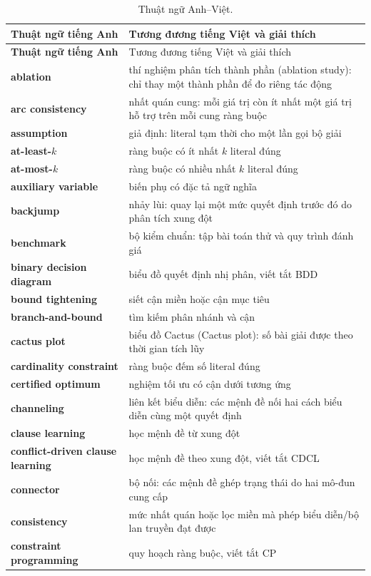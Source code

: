 \documentclass[11pt,a4paper,oneside,openany,headings=normal]{scrbook}
\begin{document}
\begin{longtable}{@{}>{\bfseries\sffamily}p{}p{}@{}}
\caption{Thuật ngữ Anh--Việt.}
\label{tab:glossary}\\
\toprule
Thuật ngữ tiếng Anh & Tương đương tiếng Việt và giải thích\\
\midrule
\endfirsthead
\toprule
Thuật ngữ tiếng Anh & Tương đương tiếng Việt và giải thích\\
\midrule
\endhead
ablation & thí nghiệm phân tích thành phần (ablation study): chỉ thay một thành phần để đo riêng tác động\\
arc consistency & nhất quán cung: mỗi giá trị còn ít nhất một giá trị hỗ trợ
trên mỗi cung ràng buộc\\
assumption & giả định: literal tạm thời cho một lần gọi bộ giải\\
at-least-\(k\) & ràng buộc có ít nhất \(k\) literal đúng\\
at-most-\(k\) & ràng buộc có nhiều nhất \(k\) literal đúng\\
auxiliary variable & biến phụ có đặc tả ngữ nghĩa\\
backjump & nhảy lùi: quay lại một mức quyết định trước đó do phân tích xung đột\\
benchmark & bộ kiểm chuẩn: tập bài toán thử và quy trình đánh giá\\
binary decision diagram & biểu đồ quyết định nhị phân, viết tắt BDD\\
bound tightening & siết cận miền hoặc cận mục tiêu\\
branch-and-bound & tìm kiếm phân nhánh và cận\\
cactus plot & biểu đồ Cactus (Cactus plot): số bài giải được theo thời gian tích lũy\\
cardinality constraint & ràng buộc đếm số literal đúng\\
certified optimum & nghiệm tối ưu có cận dưới tương ứng\\
channeling & liên kết biểu diễn: các mệnh đề nối hai cách biểu diễn cùng một
quyết định\\
clause learning & học mệnh đề từ xung đột\\
conflict-driven clause learning & học mệnh đề theo xung đột, viết tắt CDCL\\
connector & bộ nối: các mệnh đề ghép trạng thái do hai mô-đun cung cấp\\
consistency & mức nhất quán hoặc lọc miền mà phép biểu diễn/bộ lan truyền đạt được\\
constraint programming & quy hoạch ràng buộc, viết tắt CP\\

\end{longtable}
\end{document}
